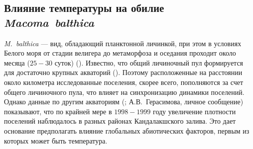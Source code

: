 \subsection{Влияние температуры на обилие \textit{Macoma~balthica}}
\textit{M.~balthica} --- вид, обладающий планктонной личинкой, при этом в условиях Белого моря от стадии велигера до метаморфоза и оседания проходит около месяца ($25 - 30$ суток) (\cite{Flyachinskaya_1999}). 
Известно, что общий личиночный пул формируется для достаточно крупных акваторий (\cite{Maximovich_Shilin_2012}). 
Поэтому расположенные на расстоянии около километра исследованные поселения, скорее всего, пополняются за счет общего личиночного пула, что влияет на синхронизацию динамики поселений. 
Однако данные по другим акваториям (\cite{Varfolomeeva_Naumov_2013}; А.В.~Герасимова, личное сообщение) показывают, что по крайней мере в $1998 - 1999$ году увеличение плотности поселений наблюдалось в разных районах Кандалакшского залива. 
Это дает основание предполагать влияние глобальных абиотических факторов, первым из которых может быть температура. 

